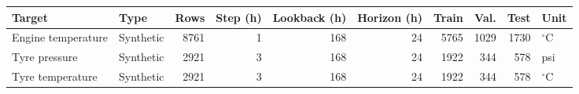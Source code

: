\begin{tabular}{llrrrrrrrl}
\toprule
Target & Type & Rows & Step (h) & Lookback (h) & Horizon (h) & Train & Val. & Test & Unit \\
\midrule
Engine temperature & Synthetic & 8761 & 1 & 168 & 24 & 5765 & 1029 & 1730 & $^\circ$C \\
Tyre pressure & Synthetic & 2921 & 3 & 168 & 24 & 1922 & 344 & 578 & psi \\
Tyre temperature & Synthetic & 2921 & 3 & 168 & 24 & 1922 & 344 & 578 & $^\circ$C \\
\bottomrule
\end{tabular}
